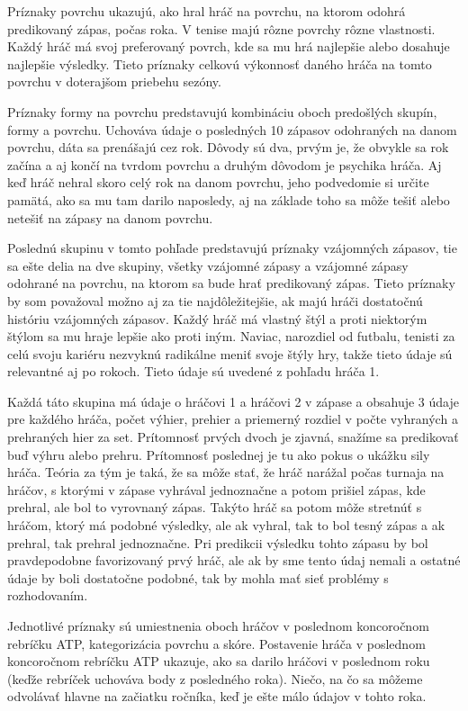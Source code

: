 Príznaky povrchu ukazujú, ako hral hráč na povrchu, na ktorom odohrá predikovaný zápas, počas roka. V tenise majú rôzne povrchy rôzne vlastnosti. Každý hráč má svoj preferovaný povrch, kde sa mu hrá najlepšie alebo dosahuje najlepšie výsledky. Tieto príznaky celkovú výkonnosť daného hráča na tomto povrchu v doterajšom priebehu sezóny.

Príznaky formy na povrchu predstavujú kombináciu oboch predošlých skupín, formy a povrchu. Uchováva údaje o posledných 10 zápasov odohraných na danom povrchu, dáta sa prenášajú cez rok. Dôvody sú dva, prvým je, že obvykle sa rok začína a aj končí na tvrdom povrchu a druhým dôvodom je psychika hráča. Aj keď hráč nehral skoro celý rok na danom povrchu, jeho podvedomie si určite pamätá, ako sa mu tam darilo naposledy, aj na základe toho sa môže tešiť alebo netešiť na zápasy na danom povrchu.

Poslednú skupinu v tomto pohľade predstavujú príznaky vzájomných zápasov, tie sa ešte delia na dve skupiny, všetky vzájomné zápasy a vzájomné zápasy odohrané na povrchu, na ktorom sa bude hrať predikovaný zápas. 
Tieto príznaky by som považoval možno aj za tie najdôležitejšie, ak majú hráči dostatočnú históriu vzájomných zápasov.
Každý hráč má vlastný štýl a proti niektorým štýlom sa mu hraje lepšie ako proti iným. Naviac, narozdiel od futbalu, tenisti za celú svoju kariéru nezvyknú radikálne meniť svoje štýly hry, takže tieto údaje sú relevantné aj po rokoch.
Tieto údaje sú uvedené z pohľadu hráča 1.

Každá táto skupina má údaje o hráčovi 1 a hráčovi 2 v zápase a obsahuje 3 údaje pre každého hráča, počet výhier, prehier a priemerný rozdiel v počte vyhraných a prehraných hier za set. Prítomnosť prvých dvoch je zjavná, snažíme sa predikovať buď výhru alebo prehru. 
Prítomnosť poslednej je tu ako pokus o ukážku sily hráča. 
Teória za tým je taká, že sa môže stať, že hráč narážal počas turnaja na hráčov, s ktorými v zápase vyhrával jednoznačne a potom prišiel zápas, kde prehral, ale bol to vyrovnaný zápas. 
Takýto hráč sa potom môže stretnúť s hráčom, ktorý má podobné výsledky, ale ak vyhral, tak to bol tesný zápas a ak prehral, tak prehral jednoznačne.
Pri predikcii výsledku tohto zápasu by bol pravdepodobne favorizovaný prvý hráč, ale ak by sme tento údaj nemali a ostatné údaje by boli dostatočne podobné, tak by mohla mať sieť problémy s rozhodovaním.

Jednotlivé príznaky sú umiestnenia oboch hráčov v poslednom koncoročnom rebríčku ATP, kategorizácia povrchu a skóre.
Postavenie hráča v poslednom koncoročnom rebríčku ATP ukazuje, ako sa darilo hráčovi v poslednom roku (keďže rebríček uchováva body z posledného roka). Niečo, na čo sa môžeme odvolávať hlavne na začiatku ročníka, keď je ešte málo údajov v tohto roka.


